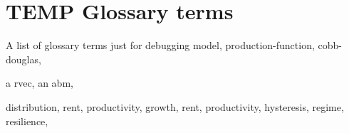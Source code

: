 \section{TEMP Glossary terms}

A list of glossary terms just for debugging
\gls{model}, 
\gls{production-function}, 
\gls{cobb-douglas}, 

a \gls{rvec}, 
an \gls{abm}, 

\gls{distribution},
\gls{rent}, 
\gls{productivity}, 
\gls{growth}, 
\gls{rent}, 
\gls{productivity}, 
\gls{hysteresis}, 
\gls{regime}, 
\gls{resilience}, 